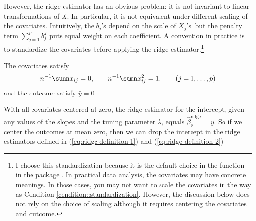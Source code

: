 However, the ridge estimator has an obvious problem: it is not invariant
to linear transformations of $X$. In particular, it is not equivalent
under different scaling of the covariates. Intuitively, the $b_{j}$'s
depend on the scale of $X_{j}$'s, but the penalty term $\sum_{j=1}^{p}b_{j}^{2}$
puts equal weight on each coefficient. A convention in practice is
to standardize the covariates before applying the ridge estimator.\footnote{
I choose this standardization because it is the default choice in the function  in the  package . 
In practical data analysis, the covariates may have concrete meanings. In those cases, you may not want to scale the covariates in the way as Condition \ref{condition::standardization}. 
However, the discussion below does not rely on the choice of scaling although it requires centering the covariates and outcome. 
} 

\begin{condition}
[standardization]\label{condition::standardization}
The covariates satisfy
\[
n^{-1}\sumn x_{ij}=0,\qquad n^{-1}\sumn x_{ij}^{2}=1,\qquad(j=1,\ldots,p)
\]
and the outcome satisfy $\bar{y} = 0$.
\end{condition}


With all covariates centered at zero, the ridge estimator for
the intercept, given any values of the slopes and the tuning parameter $\lambda$,
equals 
$
\hat{\beta}_{0}^{\text{ridge}}=\bar{y}.
$
So if we center the outcomes at mean zero, then we can drop the intercept
in the ridge estimators defined in (\ref{eq:ridge-definition-1})
and (\ref{eq:ridge-definition-2}). 


